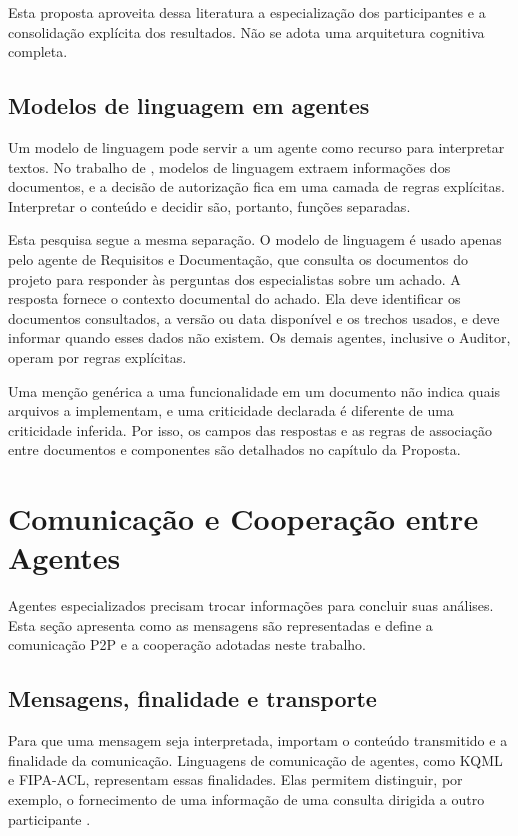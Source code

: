 Esta proposta aproveita dessa literatura a especialização dos participantes e a consolidação explícita dos resultados. Não se adota uma arquitetura cognitiva completa.

\subsection{Modelos de linguagem em agentes}
\label{rt-2-3-3}

Um modelo de linguagem pode servir a um agente como recurso para interpretar textos. No trabalho de , modelos de linguagem extraem informações dos documentos, e a decisão de autorização fica em uma camada de regras explícitas. Interpretar o conteúdo e decidir são, portanto, funções separadas.

Esta pesquisa segue a mesma separação. O modelo de linguagem é usado apenas pelo agente de Requisitos e Documentação, que consulta os documentos do projeto para responder às perguntas dos especialistas sobre um achado. A resposta fornece o contexto documental do achado. Ela deve identificar os documentos consultados, a versão ou data disponível e os trechos usados, e deve informar quando esses dados não existem. Os demais agentes, inclusive o Auditor, operam por regras explícitas.

Uma menção genérica a uma funcionalidade em um documento não indica quais arquivos a implementam, e uma criticidade declarada é diferente de uma criticidade inferida. Por isso, os campos das respostas e as regras de associação entre documentos e componentes são detalhados no capítulo da Proposta.

\section{Comunicação e Cooperação entre Agentes}
\label{rt-2-4}

Agentes especializados precisam trocar informações para concluir suas análises. Esta seção apresenta como as mensagens são representadas e define a comunicação P2P e a cooperação adotadas neste trabalho.

\subsection{Mensagens, finalidade e transporte}
\label{rt-2-4-1}

Para que uma mensagem seja interpretada, importam o conteúdo transmitido e a finalidade da comunicação. Linguagens de comunicação de agentes, como KQML e FIPA-ACL, representam essas finalidades. Elas permitem distinguir, por exemplo, o fornecimento de uma informação de uma consulta dirigida a outro participante \cite{finin1994,fipaACL2002,lazarin2025}.

